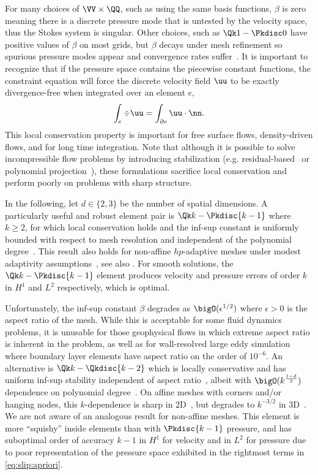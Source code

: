 For many choices of $\VV \times \QQ$, such as using the same basis functions, $\beta$ is zero meaning there is a discrete pressure mode that is untested by the velocity space, thus the Stokes system is singular.
Other choices, such as $\Qk 1-\Pkdisc 0$ have positive values of $\beta$ on most grids, but $\beta$ decays under mesh refinement so spurious pressure modes appear and convergence rates suffer~\citep{brenner2008mathematical,chapelle1993inf,babuska1997babuska}.
It is important to recognize that if the pressure space contains the piecewise constant functions, the constraint equation will force the discrete velocity field $\uu$ to be exactly divergence-free when integrated over an element $e$,
\begin{gather*}
  \int_e \div\uu = \int_{\partial e} \uu\cdot\nn.
\end{gather*}
This local conservation property is important for free surface flows, density-driven flows, and for long time integration.
Note that although it is possible to solve incompressible flow problems by introducing stabilization (e.g. residual-based~\citep{hughes1986new} or polynomial projection~\citep{dohrmann2004stabilized}), these formulations sacrifice local conservation and perform poorly on problems with sharp structure.

In the following, let $d\in \{2,3\}$ be the number of spatial dimensions.
A particularly useful and robust element pair is $\Qk k-\Pkdisc{k-1}$ where $k \ge 2$, for which local conservation holds and the inf-sup constant is uniformly bounded with respect to mesh resolution and independent of the polynomial degree~\citep{bernardi1999uniform}.
This result also holds for non-affine $hp$-adaptive meshes under modest adaptivity assumptions~\citep{schieweck2008uniformly}, see also \citet{matthies2002inf}.
For smooth solutions, the $\Qk k-\Pkdisc{k-1}$ element produces velocity and pressure errors of order $k$ in $H^1$ and $L^2$ respectively, which is optimal.

Unfortunately, the inf-sup constant $\beta$ degrades as $\bigO(\epsilon^{1/2})$ where $\epsilon > 0$ is the aspect ratio of the mesh.
While this is acceptable for some fluid dynamics problems, it is unusable for those geophysical flows in which extreme aspect ratio is inherent in the problem, as well as for wall-resolved large eddy simulation where boundary layer elements have aspect ratio on the order of $10^{-6}$.
An alternative is $\Qk k - \Qkdisc{k-2}$ which is locally conservative and has uniform inf-sup stability independent of aspect ratio~\citep{stenberg1996mixed,schotzau1998mhf}, albeit with $\bigO(k^\frac{1-d}{2})$ dependence on polynomial degree~\citep{maday1992pn}.
On affine meshes with corners and/or hanging nodes, this $k$-dependence is sharp in 2D~\citep{schotzau1999mhf}, but degrades to $k^{-3/2}$ in 3D~\citep{toselli2003mhf}.
We are not aware of an analogous result for non-affine meshes.
This element is more ``squishy'' inside elements than with $\Pkdisc{k-1}$ pressure, and has suboptimal order of accuracy $k-1$ in $H^1$ for velocity and in $L^2$ for pressure due to poor representation of the pressure space exhibited in the rightmost terms in \eqref{eq:slip:apriori}.

